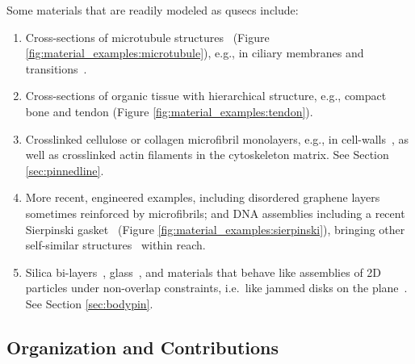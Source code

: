 Some materials that are readily modeled as qusecs include:
%
\begin{enumerate}
    \item \label{materialexample1} Cross-sections of microtubule structures~\cite{microtubule_necklace} (Figure \ref{fig:material_examples:microtubule}), e.g., in ciliary membranes and transitions~\cite{microtubule_cilia}.

    \item \label{materialexample2} Cross-sections of organic tissue with hierarchical structure, e.g., compact bone and tendon (Figure \ref{fig:material_examples:tendon}).

    \item \label{materialexample3} Crosslinked cellulose or collagen microfibril monolayers, e.g., in cell-walls~\cite{wikimediacommons2010afm, wikimediacommons2007plant}, as well as crosslinked actin filaments in the cytoskeleton matrix. See Section \ref{sec:pinnedline}.

    \item \label{materialexample4} More recent, engineered examples, including disordered graphene layers~\cite{Graphene1, Graphene2} sometimes reinforced by microfibrils; and DNA assemblies including a recent Sierpinski gasket~\cite{self_assembly_sierpinski} (Figure \ref{fig:material_examples:sierpinski}), bringing other self-similar structures~\cite{wikimediacommons2012subdivision} within reach.

    \item \label{materialexample5} Silica bi-layers~\cite{silica_bilayers}, glass~\cite{sructure_of_2d_glass}, and materials that behave like assemblies of 2D particles under non-overlap constraints, i.e.\ like jammed disks on the plane~\cite{jammed_disks}. See Section \ref{sec:bodypin}.
\end{enumerate}




\subsection{Organization and Contributions}
\label{sec:cont}

